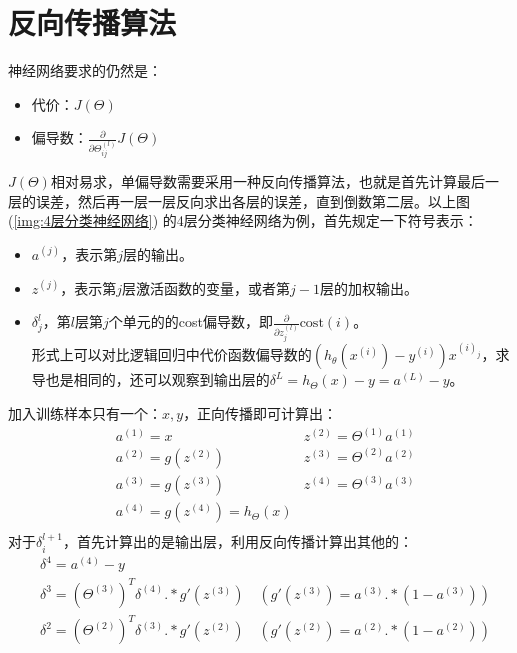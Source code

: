 \documentclass[../main.tex]{subfiles}
\begin{document}
\section{反向传播算法}
神经网络要求的仍然是：
\begin{itemize}
    \item 代价：\(J(Θ)\)
    \item 偏导数：\(\frac{∂}{∂Θ^{(l)}_{ij}}J(Θ)\)
\end{itemize}
\(J(Θ)\)相对易求，单偏导数需要采用一种反向传播算法，也就是首先计算最后一层的误差，然后再一层一层反向求出各层的误差，直到倒数第二层。以上图 (\ref{img:4层分类神经网络}) 的4层分类神经网络为例，首先规定一下符号表示：
\begin{itemize}
    \item \(a^{(j)}\)，表示第\(j\)层的输出。
    \item \(z^{(j)}\)，表示第\(j\)层激活函数的变量，或者第\(j-1\)层的加权输出。
    \item \(δ^{l}_j\)，第\(l\)层第\(j\)个单元的的cost偏导数，即\(\frac{∂}{∂z^{(l)}_j}\mathrm{cost}(i)\)。
    \\形式上可以对比逻辑回归中代价函数偏导数的\((h_θ(x^{(i)}) - y^{(i)})x^{(i)_j}\)，求导也是相同的，还可以观察到输出层的\(δ^{L}= h_Θ(x) - y = a^{(L)} - y\)。
\end{itemize}
加入训练样本只有一个：\(x, y\)，正向传播即可计算出：
\begin{align*}
     & a^{(1)} = x                   & z^{(2)} = Θ^{(1)}a^{(1)} \\
     & a^{(2)} = g(z^{(2)})          & z^{(3)} = Θ^{(2)}a^{(2)} \\
     & a^{(3)} = g(z^{(3)})          & z^{(4)} = Θ^{(3)}a^{(3)} \\
     & a^{(4)} = g(z^{(4)}) = h_Θ(x)                            \\
\end{align*}
对于\(δ^{l+1}_i\)，首先计算出的是输出层，利用反向传播计算出其他的：
\begin{align*}
     & δ^{4} = a^{(4)} - y                                                                \\
     & δ^{3} = (Θ^{(3)})^Tδ^{(4)}.*g'(z^{(3)}) \quad (g'(z^{(3)}) = a^{(3)}.*(1-a^{(3)})) \\
     & δ^{2} = (Θ^{(2)})^Tδ^{(3)}.*g'(z^{(2)}) \quad (g'(z^{(2)}) = a^{(2)}.*(1-a^{(2)})) \\
\end{align*}
\end{document}
